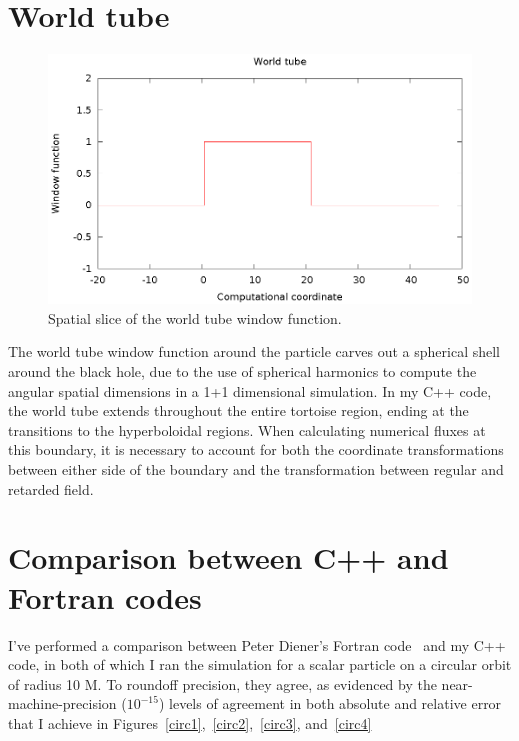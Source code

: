 \section{World tube}
\begin{figure}
\includegraphics{worldTubeItself}
\caption{Spatial slice of the world tube window function.}
\label{wtwindow}
\end{figure}

The world tube window function around the particle carves out a spherical shell around the black hole, due to the use of spherical harmonics to compute the angular spatial dimensions in a 1+1 dimensional simulation. In my C++ code, the world tube extends throughout the entire tortoise region, ending at the transitions to the hyperboloidal regions. When calculating numerical fluxes at this boundary, it is necessary to account for both the coordinate transformations between either side of the boundary and the transformation between regular and retarded field.




\section{Comparison between C++ and Fortran codes}

I've performed a comparison between Peter Diener's Fortran code~\cite{heffernan_ottewil_wardell_modesum_basisForCode} and my C++ code, in both of which I ran the simulation for a scalar particle on a circular orbit of radius 10 M. To roundoff precision, they agree, as evidenced by the near-machine-precision ($10^{-15}$) levels of agreement in both absolute and relative error that I achieve in Figures~\ref{circ1},~\ref{circ2},~\ref{circ3}, and~\ref{circ4}


